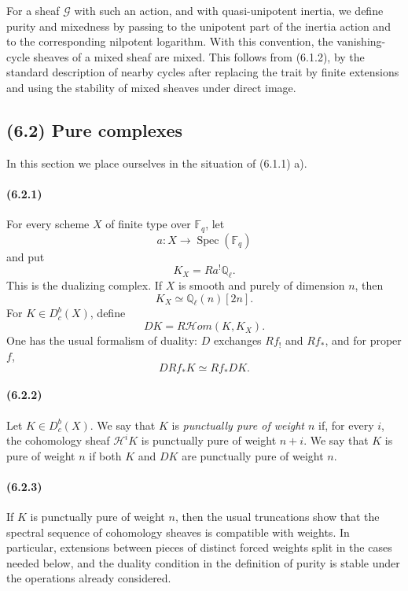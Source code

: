 \documentclass[11pt]{article}
\theoremstyle{remark}
\newcommand{\Ql}{\mathbb{Q}_\ell}
\newcommand{\Fq}{\mathbb{F}_q}
\begin{document}
For a sheaf \(\mathcal G\) with such an action, and with quasi-unipotent inertia, we define purity and mixedness by passing to the unipotent part of the inertia action and to the corresponding nilpotent logarithm.  With this convention, the vanishing-cycle sheaves of a mixed sheaf are mixed.  This follows from (6.1.2), by the standard description of nearby cycles after replacing the trait by finite extensions and using the stability of mixed sheaves under direct image.

\subsection*{(6.2) Pure complexes}

In this section we place ourselves in the situation of (6.1.1) a).

\paragraph{(6.2.1)}
For every scheme \(X\) of finite type over \(\Fq\), let
\[
 a:X\longrightarrow \operatorname{Spec}(\Fq)
\]
and put
\[
K_X=Ra^!\Ql.
\]
This is the dualizing complex.  If \(X\) is smooth and purely of dimension \(n\), then
\[
K_X\simeq \Ql(n)[2n].
\]
For \(K\in D^b_c(X)\), define
\[
DK=R\mathcal Hom(K,K_X).
\]
One has the usual formalism of duality: \(D\) exchanges \(Rf_!\) and \(Rf_*\), and for proper \(f\),
\[
DRf_*K\simeq Rf_*DK.
\]

\paragraph{(6.2.2)}
Let \(K\in D^b_c(X)\).  We say that \(K\) is \emph{punctually pure of weight \(n\)} if, for every \(i\), the cohomology sheaf \(\mathcal H^iK\) is punctually pure of weight \(n+i\).  We say that \(K\) is pure of weight \(n\) if both \(K\) and \(DK\) are punctually pure of weight \(n\).

\paragraph{(6.2.3)}
If \(K\) is punctually pure of weight \(n\), then the usual truncations show that the spectral sequence of cohomology sheaves is compatible with weights.  In particular, extensions between pieces of distinct forced weights split in the cases needed below, and the duality condition in the definition of purity is stable under the operations already considered.
\end{document}

